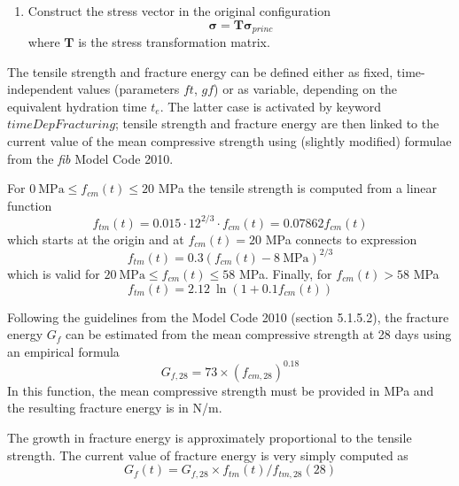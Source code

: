 \documentclass[a4paper]{article}
\begin{document}
\begin{enumerate}
\item{Construct the stress vector in the original configuration}
\begin{equation}
\boldsymbol {\sigma} = \boldsymbol{T} \boldsymbol {\sigma}_{princ}
\end{equation}
where $\boldsymbol{T}$ is the stress transformation matrix.

\end{enumerate}

The tensile strength and fracture energy can be defined either as fixed, time-independent values (parameters $ft$, $gf$) or as variable, depending on the equivalent hydration time $t_e$. The latter case is activated by keyword $timeDepFracturing$; tensile strength and fracture energy are then linked to the current value of the mean compressive strength using (slightly modified) formulae from the {\sl{fib}} Model Code 2010.

For $0 \: \mathrm{MPa} \leq f_{cm}(t) \leq 20$ MPa the tensile
strength is computed from a linear function 
\begin{equation}
f_{tm}(t) = 0.015 \cdot 12^{2/3} \cdot f_{cm}(t) = 0.07862 f_{cm}(t)
\end{equation}
which starts at the origin and at $f_{cm}(t) = 20$ MPa connects to expression
\begin{equation}
f_{tm}(t) = 0.3 (f_{cm}(t) - 8 \: \mathrm{MPa})^{2/3} 
\end{equation}
which is valid for $20 \: \mathrm{MPa} \leq f_{cm}(t) \leq 58$ MPa.
Finally, for $f_{cm}(t) > 58$ MPa 
\begin{equation}
f_{tm}(t) = 2.12 \: \ln \left( 1 + 0.1 f_{cm}(t) \right ) 
\end{equation}

Following the guidelines from the Model Code 2010 (section 5.1.5.2),
the fracture energy $G_f$ can be estimated from the mean compressive
strength at 28 days using an empirical formula
\begin{equation}
G_{f,28} = 73 \times \left( f_{cm,28} \right)^{0.18}
\label{gf}
\end{equation}
In this function, the mean compressive strength must be provided in MPa and
the resulting fracture energy is in N/m.

The growth in fracture
energy is approximately proportional to the tensile strength. 
The current value of fracture energy is very simply computed as 
\begin{equation}
 G_f(t) = G_{f,28} \times f_{tm}(t) / f_{tm,28}(28)
\label{gf_time}
\end{equation}
\end{document}
